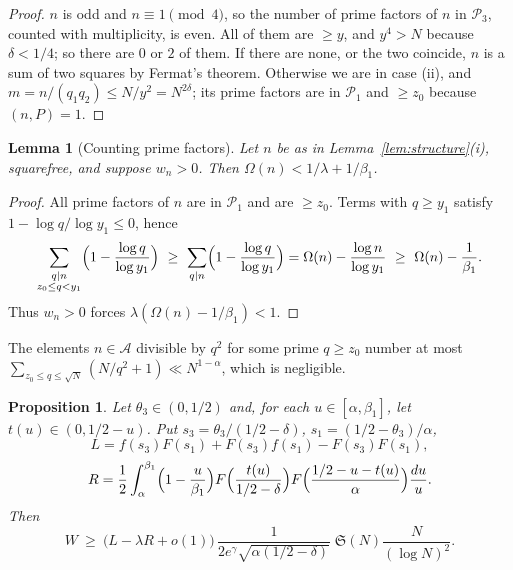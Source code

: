 \documentclass[11pt]{amsart}
\newtheorem{proposition}[theorem]{Proposition}
\newtheorem{lemma}[theorem]{Lemma}
\theoremstyle{remark}
\newcommand{\cA}{\mathcal{A}}
\newcommand{\cP}{\mathcal{P}}
\newcommand{\Sg}{\mathfrak{S}}
\begin{document}
\begin{proof}
$n$ is odd and $n\equiv1\pmod 4$, so the number of prime factors of $n$ in $\cP_3$, counted with
multiplicity, is even. All of them are $\ge y$, and $y^4>N$ because $\delta<1/4$; so there are $0$ or $2$
of them. If there are none, or the two coincide, $n$ is a sum of two squares by Fermat's theorem. Otherwise
we are in case (ii), and $m=n/(q_1q_2)\le N/y^2=N^{2\delta}$; its prime factors are in $\cP_1$ and
$\ge z_0$ because $(n,P)=1$.
\end{proof}

\begin{lemma}[Counting prime factors]\label{lem:omega}
Let $n$ be as in Lemma~\ref{lem:structure}(i), squarefree, and suppose $w_n>0$. Then
$\Omega(n)<1/\lambda+1/\beta_1$.
\end{lemma}

\begin{proof}
All prime factors of $n$ are in $\cP_1$ and are $\ge z_0$. Terms with $q\ge y_1$ satisfy
$1-\log q/\log y_1\le 0$, hence
\[
\sum_{\substack{q\mid n\\ z_0\le q<y_1}}\Bigl(1-\frac{\log q}{\log y_1}\Bigr)\ \ge\
\sum_{q\mid n}\Bigl(1-\frac{\log q}{\log y_1}\Bigr)=\Omega(n)-\frac{\log n}{\log y_1}\ \ge\
\Omega(n)-\frac{1}{\beta_1}.
\]
Thus $w_n>0$ forces $\lambda(\Omega(n)-1/\beta_1)<1$.
\end{proof}

The elements $n\in\cA$ divisible by $q^2$ for some prime $q\ge z_0$ number at most
$\sum_{z_0\le q\le\sqrt N}(N/q^2+1)\ll N^{1-\alpha}$, which is negligible.

\begin{proposition}\label{prop:W}
Let $\theta_3\in(0,1/2)$ and, for each $u\in[\alpha,\beta_1]$, let $t(u)\in(0,1/2-u)$. Put
$s_3=\theta_3/(1/2-\delta)$, $s_1=(1/2-\theta_3)/\alpha$,
\[
L=f(s_3)F(s_1)+F(s_3)f(s_1)-F(s_3)F(s_1),
\]
\[
R=\frac12\int_{\alpha}^{\beta_1}\Bigl(1-\frac{u}{\beta_1}\Bigr)
F\Bigl(\frac{t(u)}{1/2-\delta}\Bigr)F\Bigl(\frac{1/2-u-t(u)}{\alpha}\Bigr)\frac{du}{u}.
\]
Then
\[
W\ \ge\ \bigl(L-\lambda R+o(1)\bigr)\,\frac{1}{2e^{\gamma}\sqrt{\alpha(1/2-\delta)}}\;\Sg(N)\frac{N}{(\log N)^2}.
\]
\end{proposition}
\end{document}
